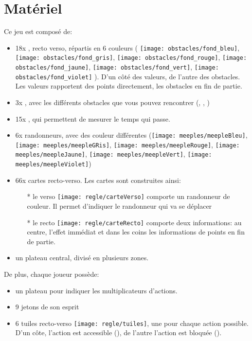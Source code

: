 \section*{Matériel} \label{sec:Matériel}

Ce jeu est composé de:
\begin{itemize}
\item 18x \jetonsObstacles, recto verso, répartis en 6 couleurs ( \texttt{[image: obstacles/fond\_bleu]}, 
\texttt{[image: obstacles/fond\_gris]}, \texttt{[image: obstacles/fond\_rouge]}, \texttt{[image: obstacles/fond\_jaune]}, \texttt{[image: obstacles/fond\_vert]}, \texttt{[image: obstacles/fond\_violet]} ). D'un côté des valeurs, de l'autre des obstacles. Les valeurs rapportent des points directement, les obstacles en fin de partie.
\item 3x \marqueursObstacles, avec les différents obstacles que vous pouvez rencontrer (\arbre, \tronc, \rocher)
\item 15x \jetonsMeteo, qui permettent de mesurer le temps qui passe.
\item 6x randonneurs, avec des couleur différentes (\texttt{[image: meeples/meepleBleu]}, \texttt{[image: meeples/meepleGRis]}, \texttt{[image: meeples/meepleRouge]}, \texttt{[image: meeples/meepleJaune]}, \texttt{[image: meeples/meepleVert]}, \texttt{[image: meeples/meepleViolet]})
\item 66x cartes recto-verso. Les cartes sont construites ainsi:
\begin{itemize}
\item[*] le verso \texttt{[image: regle/carteVerso]} comporte un randonneur de couleur. Il permet d'indiquer le randonneur qui va se déplacer
\item[*] le recto \texttt{[image: regle/carteRecto]} comporte deux informations: au centre, l'effet immédiat et dans les coins les informations de points en fin de partie.
\end{itemize}
\item un plateau central, divisé en plusieurs zones.
\end{itemize}

De plus, chaque joueur possède:
\begin{itemize}
\item un plateau pour indiquer les multiplicateurs d'actions.
\item 9 jetons de son esprit
\item 6 tuiles recto-verso \texttt{[image: regle/tuiles]}, une pour chaque action possible. D'un côte, l'action est accessible (\tuileActive), de l'autre l'action est bloquée (\tuileBloquee).
\end{itemize}
\FloatBarrier
